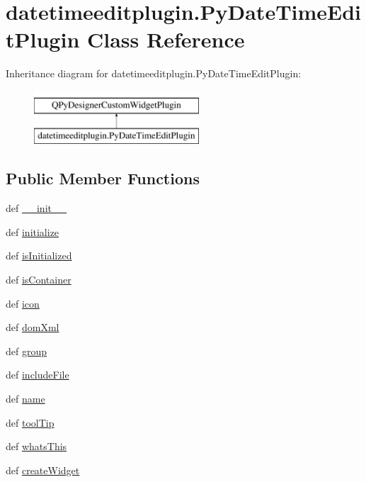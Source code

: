 \hypertarget{classdatetimeeditplugin_1_1PyDateTimeEditPlugin}{}\section{datetimeeditplugin.\+Py\+Date\+Time\+Edit\+Plugin Class Reference}
\label{classdatetimeeditplugin_1_1PyDateTimeEditPlugin}
Inheritance diagram for datetimeeditplugin.\+Py\+Date\+Time\+Edit\+Plugin\+:\begin{figure}[H]
\begin{center}
\leavevmode
\includegraphics[height=2.000000cm]{classdatetimeeditplugin_1_1PyDateTimeEditPlugin}
\end{center}
\end{figure}
\subsection*{Public Member Functions}
\begin{DoxyCompactItemize}
\item 
def \hyperlink{classdatetimeeditplugin_1_1PyDateTimeEditPlugin_ad28777d8e75edbd540c1154476e64ab1}{\+\_\+\+\_\+init\+\_\+\+\_\+}
\item 
def \hyperlink{classdatetimeeditplugin_1_1PyDateTimeEditPlugin_a1bd1b6ba052eb18ba0b72a17fe2b5592}{initialize}
\item 
def \hyperlink{classdatetimeeditplugin_1_1PyDateTimeEditPlugin_a9b05ce3b0eca76c1eb1c1d30828caa3e}{is\+Initialized}
\item 
def \hyperlink{classdatetimeeditplugin_1_1PyDateTimeEditPlugin_a910fcaeae891e47bcbdbf60bd1b89694}{is\+Container}
\item 
def \hyperlink{classdatetimeeditplugin_1_1PyDateTimeEditPlugin_a375b25f5ca6da5850c36ddb00a4aa377}{icon}
\item 
def \hyperlink{classdatetimeeditplugin_1_1PyDateTimeEditPlugin_ae1ba1439d82db2be07e4223c4944ad5d}{dom\+Xml}
\item 
def \hyperlink{classdatetimeeditplugin_1_1PyDateTimeEditPlugin_a631066acf7f5b1a29f86c0e82d30d67d}{group}
\item 
def \hyperlink{classdatetimeeditplugin_1_1PyDateTimeEditPlugin_ad95b04bd0e9f9cb58059b6f59618300d}{include\+File}
\item 
def \hyperlink{classdatetimeeditplugin_1_1PyDateTimeEditPlugin_a56a8354da5c1f9e1629ff91b977c7bc7}{name}
\item 
def \hyperlink{classdatetimeeditplugin_1_1PyDateTimeEditPlugin_a1214af5062d2ffe6040cb6174bc66506}{tool\+Tip}
\item 
def \hyperlink{classdatetimeeditplugin_1_1PyDateTimeEditPlugin_af2735be0bc759bef83854419b3b4ecd8}{whats\+This}
\item 
def \hyperlink{classdatetimeeditplugin_1_1PyDateTimeEditPlugin_acdca8efd7cbad435e89946303958e3ce}{create\+Widget}
\end{DoxyCompactItemize}
